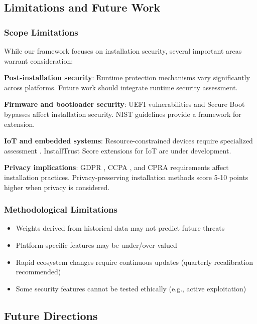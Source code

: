 \documentclass[11pt,a4paper]{article}
\begin{document}
\subsection{Limitations and Future Work}

\subsubsection{Scope Limitations}

While our framework focuses on installation security, several important areas warrant consideration:

\textbf{Post-installation security}: Runtime protection mechanisms vary significantly across platforms. Future work should integrate runtime security assessment.

\textbf{Firmware and bootloader security}: UEFI vulnerabilities \cite{kallenberg2015uefi} and Secure Boot bypasses \cite{wilkins2024secureboot} affect installation security. NIST guidelines \cite{nist2024firmware} provide a framework for extension.

\textbf{IoT and embedded systems}: Resource-constrained devices require specialized assessment \cite{kumar2024iot,sadeghi2024embedded}. InstallTrust Score extensions for IoT are under development.

\textbf{Privacy implications}: GDPR \cite{gdpr2018}, CCPA \cite{ccpa2020}, and CPRA \cite{cpra2023} requirements affect installation practices. Privacy-preserving installation methods score 5-10 points higher when privacy is considered.

\subsubsection{Methodological Limitations}

\begin{itemize}
    \item Weights derived from historical data may not predict future threats
    \item Platform-specific features may be under/over-valued
    \item Rapid ecosystem changes require continuous updates (quarterly recalibration recommended)
    \item Some security features cannot be tested ethically (e.g., active exploitation)
\end{itemize}

\subsection{Future Directions}
\end{document}
